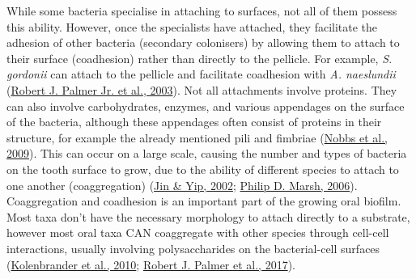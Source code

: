 \documentclass[
  letterpaper,
]{book}
\begin{document}
While some bacteria specialise in attaching to surfaces, not all of them
possess this ability. However, once the specialists have attached, they
facilitate the adhesion of other bacteria (secondary colonisers) by
allowing them to attach to their surface (coadhesion) rather than
directly to the pellicle. For example, \emph{S. gordonii} can attach to
the pellicle and facilitate coadhesion with \emph{A. naeslundii}
(\protect\hyperlink{ref-palmerCoaggregationInteractions2003}{Robert J.
Palmer Jr. et al., 2003}). Not all attachments involve proteins. They
can also involve carbohydrates, enzymes, and various appendages on the
surface of the bacteria, although these appendages often consist of
proteins in their structure, for example the already mentioned pili and
fimbriae (\protect\hyperlink{ref-nobbsStreptococcusAdherence2009}{Nobbs
et al., 2009}). This can occur on a large scale, causing the number and
types of bacteria on the tooth surface to grow, due to the ability of
different species to attach to one another (coaggregation)
(\protect\hyperlink{ref-jinSupragingivalCalculus2002}{Jin \& Yip, 2002};
\protect\hyperlink{ref-marshDentalPlaque2006}{Philip D. Marsh, 2006}).
Coaggregation and coadhesion is an important part of the growing oral
biofilm. Most taxa don't have the necessary morphology to attach
directly to a substrate, however most oral taxa CAN coaggregate with
other species through cell-cell interactions, usually involving
polysaccharides on the bacterial-cell surfaces
(\protect\hyperlink{ref-kolenbranderOralMultispecies2010}{Kolenbrander
et al., 2010};
\protect\hyperlink{ref-palmerInterbacterialAdhesion2017}{Robert J.
Palmer et al., 2017}).
\end{document}
